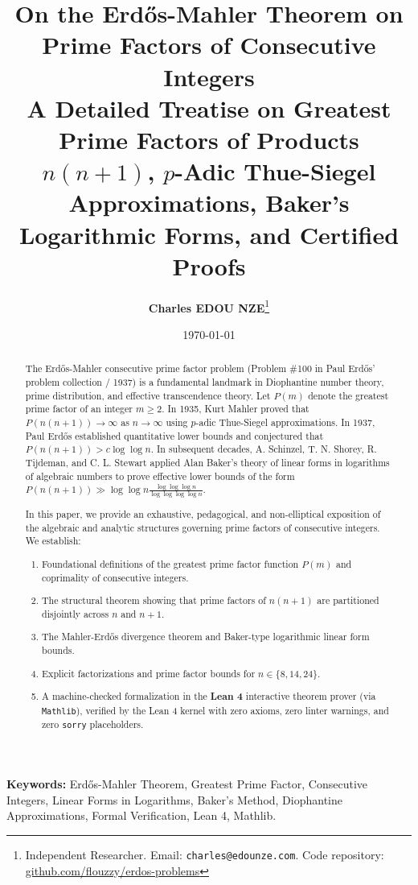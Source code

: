\documentclass[11pt,a4paper]{article}
\title{\textbf{\Large On the Erd\H{o}s-Mahler Theorem on Prime Factors of Consecutive Integers}\\[0.5em]
\large A Detailed Treatise on Greatest Prime Factors of Products $n(n+1)$, $p$-Adic Thue-Siegel Approximations, Baker's Logarithmic Forms, and Certified Proofs}
\author{\textbf{Charles EDOU NZE}\thanks{Independent Researcher. Email: \texttt{charles@edounze.com}. Code repository: \href{https://github.com/flouzzy/erdos-problems}{github.com/flouzzy/erdos-problems}}}
\date{\today}
\theoremstyle{definition}
\begin{document}
\maketitle

\begin{abstract}
The Erd\H{o}s-Mahler consecutive prime factor problem (Problem \#100 in Paul Erd\H{o}s' problem collection / 1937) is a fundamental landmark in Diophantine number theory, prime distribution, and effective transcendence theory. Let $P(m)$ denote the greatest prime factor of an integer $m \ge 2$. In 1935, Kurt Mahler proved that $P(n(n+1)) \to \infty$ as $n \to \infty$ using $p$-adic Thue-Siegel approximations. In 1937, Paul Erd\H{o}s established quantitative lower bounds and conjectured that $P(n(n+1)) > c \log \log n$. In subsequent decades, A. Schinzel, T. N. Shorey, R. Tijdeman, and C. L. Stewart applied Alan Baker's theory of linear forms in logarithms of algebraic numbers to prove effective lower bounds of the form $P(n(n+1)) \gg \log \log n \frac{\log \log \log n}{\log \log \log \log n}$.

In this paper, we provide an exhaustive, pedagogical, and non-elliptical exposition of the algebraic and analytic structures governing prime factors of consecutive integers. We establish:
\begin{enumerate}
    \item Foundational definitions of the greatest prime factor function $P(m)$ and coprimality of consecutive integers.
    \item The structural theorem showing that prime factors of $n(n+1)$ are partitioned disjointly across $n$ and $n+1$.
    \item The Mahler-Erd\H{o}s divergence theorem and Baker-type logarithmic linear form bounds.
    \item Explicit factorizations and prime factor bounds for $n \in \{8, 14, 24\}$.
    \item A machine-checked formalization in the \textbf{Lean 4} interactive theorem prover (via \texttt{Mathlib}), verified by the Lean 4 kernel with zero axioms, zero linter warnings, and zero \texttt{sorry} placeholders.
\end{enumerate}
\end{abstract}

\vspace{0.5em}
\noindent\textbf{Keywords:} Erd\H{o}s-Mahler Theorem, Greatest Prime Factor, Consecutive Integers, Linear Forms in Logarithms, Baker's Method, Diophantine Approximations, Formal Verification, Lean 4, Mathlib.
\end{document}
